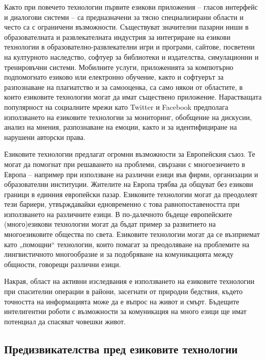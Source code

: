 \documentclass[]{../../metanetpaper}
\begin{document}
\begin{multicols}{2}

Както при повечето технологии първите езикови приложения -- гласов
 интерфейс и диалогови системи -- са предназначени за тясно специализирани области и често са с ограничени възможности. 
 Съществуват значителни пазарни ниши в образователната и развлекателната индустрия за интегриране на  езикови технологии в образователно-развлекателни  игри и програми, сайтове, посветени на културното наследство, софтуер за библиотеки и издателства, симулационни и тренировъчни системи. 
Мобилните услуги, приложенията за компютърно подпомогнато езиково или електронно обучение, както и софтуерът за разпознаване
 на плагиатство и за самооценка, са само някои от областите, в които езиковите технологии могат да имат съществено приложение. Нарастващата популярност на социалните мрежи като Twitter и Facebook предполага използването на езиковите технологии за мониторинг, обобщение на дискусии, анализ на мнения, разпознаване на емоции, както и за идентифициране на нарушени авторски права.

Езиковите технологии предлагат огромни възможности за Европейския
 съюз. Те могат да помогнат при решаването на проблеми, свързани с многоезичието в Европа – например при използване на различни езици във фирми, организации и образователни институции. Жителите на Европа трябва  да общуват без езикови граници в единния европейски пазар.  Езиковите технологии могат да преодолеят тези бариери, утвърждавайки едновременно с това равнопоставеността при използването на различните езици. 
В по-далечното бъдеще европейските (много)езикови технологии могат да бъдат пример за развитието на многоезиковите общества по света.
 Езиковите технологии могат да се възприемат като „помощни“ технологии, които помагат за преодоляване на проблемите на лингвистичното многообразие и за подобряване на комуникацията между общности, говорещи различни езици.

Накрая, област на активни изследвания е използването на езиковите технологии при спасителни операции в райони, засегнати от природни бедствия, където
 точността на информацията може да е въпрос на живот и смърт. Бъдещите интелигентни роботи с възможности за комуникация на много езици ще имат потенциал да спасяват човешки живот.

\subsection{Предизвикателства пред езиковите технологии}


\end{multicols}
\end{document}
